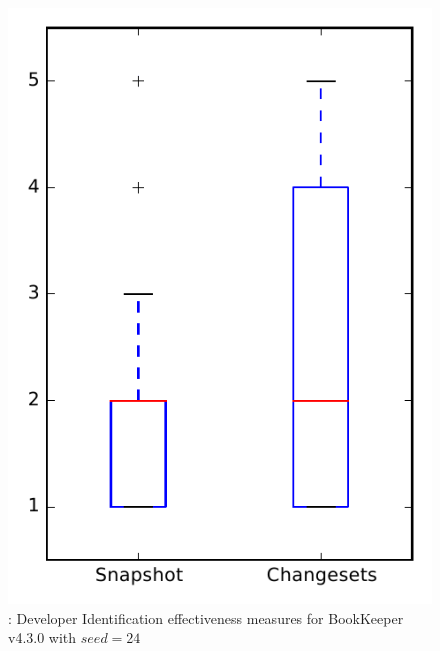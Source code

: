 
\begin{figure}
\centering
\includegraphics[height=0.4\textheight]{figures/dit_seed/rq1_bookkeeper_24}
\caption{\rtwo: Developer Identification effectiveness measures for BookKeeper v4.3.0 with $seed=24$}
\label{fig:dit_seed:rq1:bookkeeper}
\end{figure}
